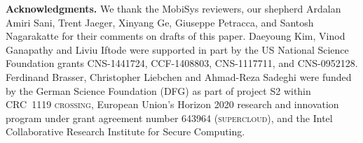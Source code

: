 \documentclass[pageno]{sig-alternate-05-2015}
\newcommand{\myparagraph}[1]{\indent\par\noindent\textsf{\textbf{#1.}}}
\renewcommand{\baselinestretch}{1}
\begin{document}
\myparagraph{Acknowledgments} 
%
%
We thank the MobiSys reviewers, our shepherd Ardalan Amiri Sani, Trent Jaeger,
Xinyang Ge, Giuseppe Petracca, and Santosh Nagarakatte for their comments on
drafts of this paper. Daeyoung Kim, Vinod Ganapathy and Liviu Iftode were
supported in part by the US National Science Foundation grants CNS-1441724,
CCF-1408803, CNS-1117711, and CNS-0952128.  Ferdinand Brasser, Christopher
Liebchen and Ahmad-Reza Sadeghi were funded by the German Science Foundation
(DFG) as part of project S2 within CRC~1119 \textsc{crossing}, European Union's
Horizon 2020 research and innovation program under grant agreement number
643964 (\textsc{supercloud}), and the Intel Collaborative Research Institute
for Secure Computing. 


\small
\renewcommand{\baselinestretch}{1}
\let\oldthebibliography=\thebibliography
  \let\endoldthebibliography=\endthebibliography
  \renewenvironment{thebibliography}[1]{%
    \begin{oldthebibliography}{#1}%
      \setlength{\parskip}{0.25ex}%
      \setlength{\itemsep}{0.25ex}%
  }%
  {%
    \end{oldthebibliography}%
  }

% 
% 
\end{document}
